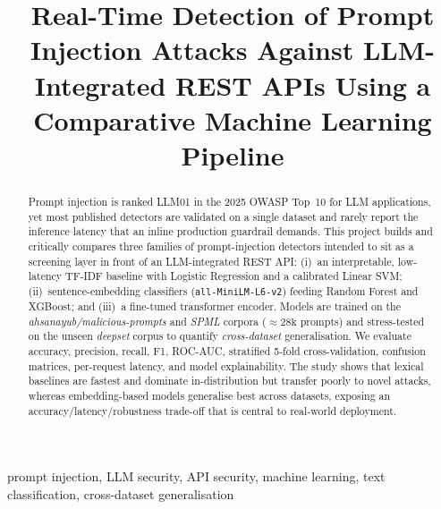 \documentclass[conference]{IEEEtran}
\begin{document}
\title{Real-Time Detection of Prompt Injection Attacks Against
LLM-Integrated REST APIs Using a Comparative Machine Learning Pipeline}

\author{
}

\maketitle

\begin{abstract}
Prompt injection is ranked LLM01 in the 2025 OWASP Top~10 for LLM
applications, yet most published detectors are validated on a single dataset
and rarely report the inference latency that an inline production guardrail
demands. This project builds and critically compares three families of
prompt-injection detectors intended to sit as a screening layer in front of an
LLM-integrated REST API: (i)~an interpretable, low-latency TF-IDF baseline with
Logistic Regression and a calibrated Linear SVM; (ii)~sentence-embedding
classifiers (\texttt{all-MiniLM-L6-v2}) feeding Random Forest and XGBoost; and
(iii)~a fine-tuned transformer encoder. Models are trained on the
\emph{ahsanayub/malicious-prompts} and \emph{SPML} corpora
(\(\approx\!28\text{k}\) prompts) and stress-tested on the unseen
\emph{deepset} corpus to quantify \emph{cross-dataset} generalisation. We
evaluate accuracy, precision, recall, F1, ROC-AUC, stratified 5-fold
cross-validation, confusion matrices, per-request latency, and model
explainability. The study shows that lexical baselines are fastest and dominate
in-distribution but transfer poorly to novel attacks, whereas embedding-based
models generalise best across datasets, exposing an accuracy/latency/robustness
trade-off that is central to real-world deployment.
\end{abstract}

\begin{IEEEkeywords}
prompt injection, LLM security, API security, machine learning, text
classification, cross-dataset generalisation
\end{IEEEkeywords}
\end{document}
